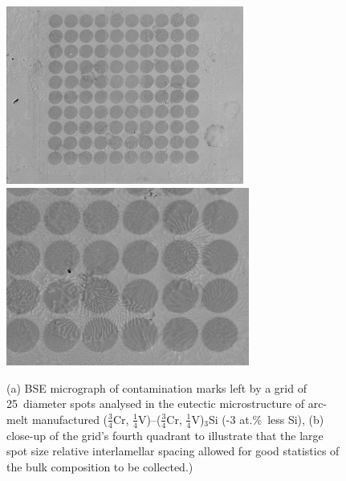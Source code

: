%
%
\begin{figure}[H]
\begin{center}
\includegraphics[width=7.8cm]{_Sep6_75Cr_eut_3Si_grid_ii_after_SE_full_grid}
\includegraphics[width=8cm]{_Sep6_75Cr_eut_3Si_grid_ii_after_BSE_4th_quadrant}
\caption{ (a) BSE micrograph of contamination marks left by a grid of 25\micro\metre\ diameter spots analysed in the eutectic microstructure of arc-melt manufactured ($\frac{3}{4}$Cr, $\frac{1}{4}$V)--($\frac{3}{4}$Cr, $\frac{1}{4}$V)$_3$Si (-3 at.\%\ less Si), (b) close-up of the grid's fourth quadrant to illustrate that the large spot size relative interlamellar spacing allowed for good statistics of the bulk composition to be collected.)}
\label{fig:75CrgridiiSEafter}
\end{center}
\end{figure}
%
%
